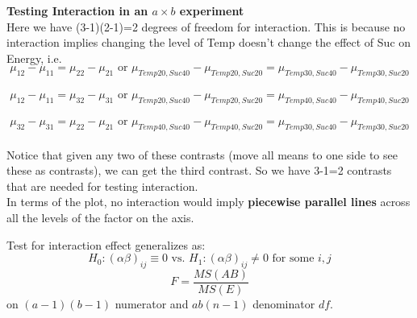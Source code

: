 \textbf{Testing Interaction in an $a \times b$ experiment}\\
Here we have (3-1)(2-1)=2 degrees of freedom for interaction. This is because no interaction implies changing the level of Temp doesn't change the effect of Suc on Energy, i.e.\\
$$\mu_{12}-\mu_{11}=\mu_{22}-\mu_{21}\mbox{ or }\mu_{Temp20,Suc40}-\mu_{Temp20,Suc20}=\mu_{Temp30,Suc40}-\mu_{Temp30,Suc20}$$~\\
$$\mu_{12}-\mu_{11}=\mu_{32}-\mu_{31}\mbox{ or }\mu_{Temp20,Suc40}-\mu_{Temp20,Suc20}=\mu_{Temp40,Suc40}-\mu_{Temp40,Suc20}$$~\\
$$\mu_{32}-\mu_{31}=\mu_{22}-\mu_{21}\mbox{ or }\mu_{Temp40,Suc40}-\mu_{Temp40,Suc20}=\mu_{Temp30,Suc40}-\mu_{Temp30,Suc20}$$~\\
Notice that given any two of these contrasts (move all means to one side to see these as contrasts), we can get the third contrast.  So we have 3-1=2 contrasts that are needed for testing interaction.\\


In terms of the plot, no interaction would imply \textbf{piecewise parallel lines} across all the levels of the factor on the axis.

\newpage

Test for interaction effect generalizes as:
$$ H_0: (\alpha \beta)_{ij} \equiv 0 \mbox{ vs. }  H_1: (\alpha \beta)_{ij} \neq 0 \mbox{ for some } i,j$$
$$ F=\frac{MS(AB)}{MS(E)}$$
on $(a-1)(b-1)$ numerator and $ab(n-1)$ denominator $df$.  \\~\\

